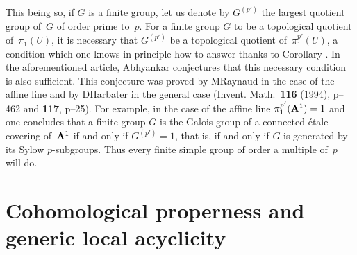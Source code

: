 \begin{remarkMR}
This being so, if $G$ is a finite group, let us denote by $G^{(p')}$ the largest
quotient group of~$G$ of order prime to~$p$. For a finite group
$G$ to be a topological quotient of~$\pi_1(U)$, it is necessary that $G^{(p')}$
be a topological quotient of~$\pi_1^{p'}(U)$, a condition which
one knows in principle how to answer thanks to Corollary . In the
aforementioned article, Abhyankar conjectures that this necessary condition is
also sufficient. This conjecture was proved by M\ptbl Raynaud
in the case of the affine line and by D\ptbl Harbater in the general case
(Invent. Math.\ \textbf{116} (1994), p--462 and \textbf{117}, p--25). For example,
in the case of the affine line $\pi_1^{p'}(\AA^1)=1$ and one
concludes that a finite group $G$ is the Galois group of a connected
\'etale covering of~$\AA^1$ if and only if $G^{(p')} = 1$,
that is, if and only if $G$ is generated by its
Sylow $p$-subgroups. Thus every finite simple group of order a
multiple of~$p$ will do.
\end{remarkMR}


\section{Cohomological properness and generic local acyclicity}
\label{XIII.3}


